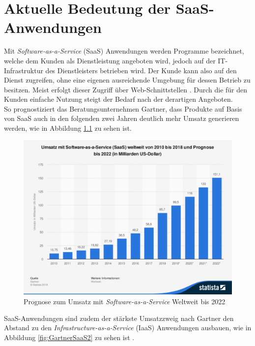 
\chapter{Aktuelle Bedeutung der SaaS-Anwendungen}

Mit \textit{Software-as-a-Service} (SaaS) Anwendungen werden Programme bezeichnet, welche dem Kunden als Dienstleistung angeboten wird, jedoch auf der IT-Infrastruktur des Dienstleisters betrieben wird. Der Kunde kann also auf den Dienst zugreifen, ohne eine eigenen ausreichende Umgebung für dessen Betrieb zu besitzen. Meist erfolgt dieser Zugriff über Web-Schnittstellen \cite{McNee2007}. Durch die für den Kunden einfache Nutzung steigt der Bedarf nach der derartigen Angeboten.\\

So prognostiziert das Beratungsunternehmen Gartner, dass Produkte auf Basis von SaaS auch in den folgenden zwei Jahren deutlich mehr Umsatz generieren werden, wie in Abbildung \ref{fig:GartnerSaaS} zu sehen ist. 

\begin{figure}[h]
	\centering
	\includegraphics[width=1\textwidth]{Bilder/einleitung/SaaSUmsatzentwicklung}
	\caption{Prognose zum Umsatz mit \textit{Software-as-a-Service} Weltweit bis 2022 \cite{Gartner2020}}
	\label{fig:GartnerSaaS}
\end{figure}

SaaS-Anwendungen sind zudem der stärkste Umsatzzweig nach Gartner den Abstand zu den \textit{Infrastructure-as-a-Service} (IaaS) Anwendungen ausbauen, wie in Abbildung \ref{fig:GartnerSaaS2} zu sehen ist \cite{Gartner2019}.

